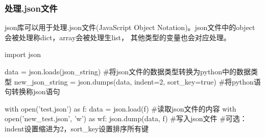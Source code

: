     \subsubsection{处理.json文件}
      json库可以用于处理.json文件(JavaScript Object Notation)。json文件中的object会被处理称dict，array会被处理生list，
      其他类型的变量也会对应处理。
      \begin{codeblock}[language=python, caption={json module}]
        import json

        data = json.loads(json_string) #将json文件的数据类型转换为python中的数据类型
        new_json_string = json.dumps(data, indent=2, sort_key=true) #将python语句转换称json语句

        with open('test.json') as f:
            data = json.load(f) #读取json文件的内容
        with open('new_test.json', 'w') as wf:
            json.dump(data, f) #写入json文件
        #可选：indent设置缩进为2，sort\_key设置排序所有键
      \end{codeblock}
